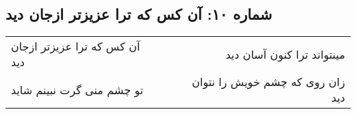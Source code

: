 \begin{center}
\section*{شماره ۱۰: آن کس که ترا عزیزتر ازجان دید}
\label{sec:010}
\begin{longtable}{l p{0.5cm} r}
آن کس که ترا عزیزتر ازجان دید
&&
مینتواند ترا کنون آسان دید
\\
تو چشم منی گرت نبینم شاید
&&
زان روی که چشم خویش را نتوان دید
\\
\end{longtable}
\end{center}
